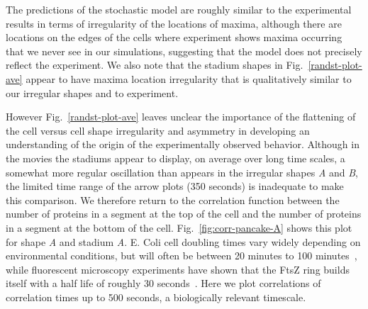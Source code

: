 \documentclass[10pt,letterpaper]{article}
\newcommand{\red}[1]{{\bf \color{red} #1}}
\newcommand{\fixme}[1]{\red{[#1]}}
\begin{document}

The predictions of the stochastic model are roughly similar to the
experimental results in terms of irregularity of the locations of
maxima, although there are locations on the edges of the cells where
experiment shows maxima occurring that we never see in our simulations,
suggesting that the model does not precisely reflect the experiment.
We also note that the stadium shapes in Fig.~\ref{randst-plot-ave}
appear to have maxima location irregularity that is qualitatively
similar to our irregular shapes and to experiment.

However Fig.~\ref{randst-plot-ave} leaves unclear the importance of
the flattening of the cell versus cell shape irregularity and
asymmetry in developing an understanding of the origin of the
experimentally observed behavior.  Although in the movies the stadiums
appear to display, on average over long time scales, a somewhat more
regular oscillation than appears in the irregular shapes \emph{A} and
\emph{B}, the limited time range of the arrow plots (350 seconds) is
inadequate to make this comparison.  We therefore return to the
correlation function between the number of proteins in a segment at
the top of the cell and the number of proteins in a segment at the
bottom of the cell.  Fig.~\ref{fig:corr-pancake-A} shows this plot for
shape \emph{A} and stadium \emph{A}.  E. Coli cell doubling times vary
widely depending on environmental conditions, but will often be
between 20 minutes to 100 minutes~\cite{pierucci1972chromosome}, while
fluorescent microscopy experiments have shown that the FtsZ ring
builds itself with a half life of roughly 30
seconds~\cite{stricker2002rapid}.  Here we plot correlations of
correlation times up to 500 seconds, a biologically relevant
timescale.
\end{document}
